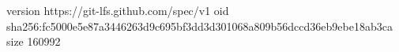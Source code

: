 version https://git-lfs.github.com/spec/v1
oid sha256:fc5000e5e87a3446263d9c695bf3dd3d301068a809b56dccd36eb9ebe18ab3ca
size 160992
